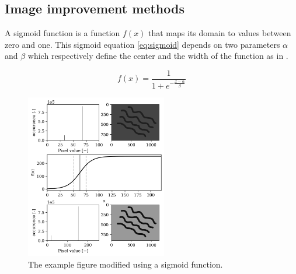 \subsection{Image improvement methods}
\label{section:imageimprovement}

A sigmoid function is a function $f(x)$ that maps its domain to values between zero and one. This sigmoid equation \ref{eq:sigmoid} depends on two parameters $\alpha$ and $\beta$ which respectively define the center and the width of the function as in \cite{article_sigmoid}.

\begin{equation}
    f(x) = \frac{1}{1+e^{-\frac{x-\alpha}{\beta}}}
    \label{eq:sigmoid}
\end{equation}

\begin{figure}
    \centering
    \includegraphics[width=0.55\textwidth,keepaspectratio]{afbeeldingen/sigmoid_explained.png}
    \caption{The example figure modified using a sigmoid function.}
    \label{fig:sigmoid}
\end{figure}

